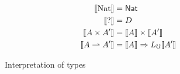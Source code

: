 %


\begin{figure*}
  \begin{align*}
    \sem{\nat} &= \Nat \\
    \sem{\dyn} &= D \\
    \sem{A \times A'} &= \sem{A} \times \sem{A'} \\ 
    \sem{A \ra A'} &= \sem{A} \To \li \sem{A'} \\
  \end{align*}
  \caption{Interpretation of types}
  \label{fig:type-interpretation}
\end{figure*}
  
\begin{figure*}
  

\end{figure*}
